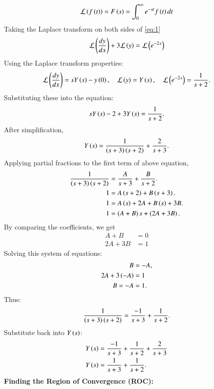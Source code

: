\documentclass[journal,12pt,onecolumn]{IEEEtran}
\theoremstyle{remark}
\begin{document}
\begin{align}
    \mathcal{L}\left(f\left(t\right)\right) = F\left(s\right) = \int_{0}^{\infty} e^{-st} f\left(t\right)  dt
\end{align}
Taking the Laplace transform on both sides of \ref{eq:1}
\begin{align}
    \mathcal{L}\left(\frac{dy}{dx}\right) + 3\mathcal{L}\left(y\right) = \mathcal{L}\left(e^{-2x}\right)
\end{align}
Using the Laplace transform properties:
\begin{align}
    \mathcal{L}\left(\frac{dy}{dx}\right) = sY\left(s\right) - y\left(0\right), \quad \mathcal{L}\left(y\right) = Y\left(s\right), \quad \mathcal{L}\left(e^{-2x}\right) = \frac{1}{s + 2}.
\end{align}
Substituting these into the equation:
\begin{align}
sY\left(s\right) - 2 + 3Y\left(s\right) = \frac{1}{s + 2}.
\end{align}
After simplification,
\begin{align}
    Y\left(s\right) = \frac{1}{\left(s + 3\right)\left(s + 2\right)} + \frac{2}{s + 3}.
\end{align}
Applying partial fractions to the first term of above equation,
\begin{align}
\frac{1}{\left(s + 3\right)\left(s + 2\right)} &= \frac{A}{s + 3} + \frac{B}{s + 2}.\\
1 &= A\left(s + 2\right) + B\left(s + 3\right).\\
1 &= A\left(s\right) + 2A + B\left(s\right) + 3B.\\
1 &= \left(A + B\right)s + \left(2A + 3B\right).
\end{align}
By comparing the coefficients, we get
\begin{align}
A + B &= 0 \\
2A + 3B &= 1
\end{align}
Solving this system of equations:
\begin{align}
B &= -A, \\
2A + 3\left(-A\right) &= 1 \\ 
B = -A &= 1.
\end{align}
Thus:
\begin{align}
\frac{1}{\left(s + 3\right)\left(s + 2\right)} = \frac{-1}{s + 3} + \frac{1}{s + 2}.
\end{align}
Substitute back into $ Y\left(s\right) $:
\begin{align}
    Y\left(s\right) &= \frac{-1}{s + 3} + \frac{1}{s + 2} + \frac{2}{s + 3}\\
    Y\left(s\right) &= \frac{1}{s + 3} + \frac{1}{s + 2}.
\end{align}
\textbf{Finding the Region of Convergence (ROC):}\\
\end{document}
